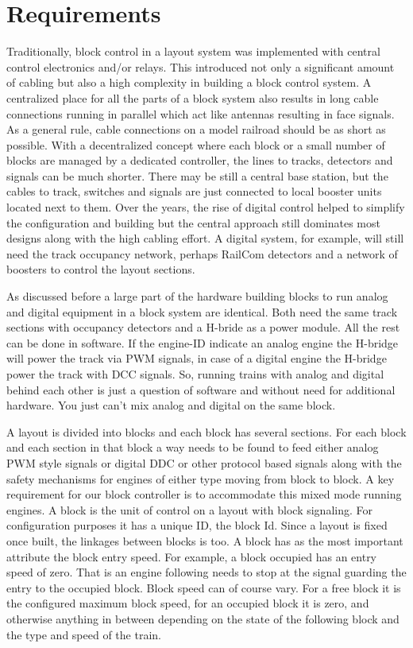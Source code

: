 \section{Requirements}

Traditionally, block control in a layout system was implemented with central control electronics and/or relays. This introduced not only a significant amount of cabling but also a high complexity in building a block control system. A centralized place for all the parts of a block system also results in long cable connections running in parallel which act like antennas resulting in face signals. As a general rule, cable connections on a model railroad should be as short as possible. With a decentralized concept where each block or a small number of blocks are managed by a dedicated controller, the lines to tracks, detectors and signals can be much shorter. There may be still a central base station, but the cables to track, switches and signals are just connected to local booster units located next to them. Over the years, the rise of digital control helped to simplify the configuration and building but the central approach still dominates most designs along with the high cabling effort. A digital system, for example, will still need the track occupancy network, perhaps RailCom detectors and a network of boosters to control the layout sections.

As discussed before a large part of the hardware building blocks to run analog and digital equipment in a block system are identical. Both need the same track sections with occupancy detectors and a H-bride as a power module. All the rest can be done in software. If the engine-ID indicate an analog engine the H-bridge will power the track via PWM signals, in case of a digital engine the H-bridge power the track with DCC signals. So, running trains with analog and digital behind each other is just a question of software and without need for additional hardware. You just can’t mix analog and digital on the same block.

A layout is divided into blocks and each block has several sections. For each block and each section in that block a way needs to be found to feed either analog PWM style signals or digital DDC or other protocol based signals along with the safety mechanisms for engines of either type moving from block to block. A key requirement for our block controller is to accommodate this mixed mode running engines. A block is the unit of control on a layout with block signaling. For configuration purposes it has a unique ID, the block Id. Since a layout is fixed once built, the linkages between blocks is too. A block has as the most important attribute the block entry speed. For example, a block occupied has an entry speed of zero. That is an engine following needs to stop at the signal guarding the entry to the occupied block. Block speed can of course vary. For a free block it is the configured maximum block speed, for an occupied block it is zero, and otherwise anything in between depending on the state of the following block and the type and speed of the train.

